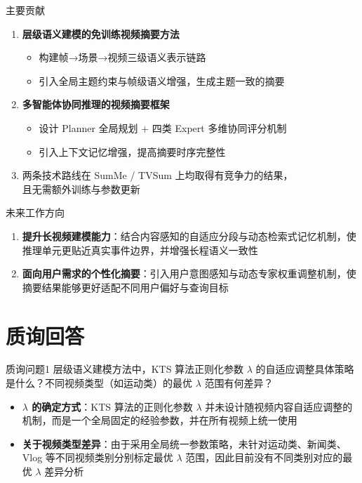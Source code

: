 \begin{frame}{主要贡献}
  \begin{enumerate}
    \item \textbf{层级语义建模的免训练视频摘要方法}
      \begin{itemize}
        \item 构建帧→场景→视频三级语义表示链路
        \item 引入全局主题约束与帧级语义增强，生成主题一致的摘要
      \end{itemize}
    \item \textbf{多智能体协同推理的视频摘要框架}
      \begin{itemize}
        \item 设计 Planner 全局规划 + 四类 Expert 多维协同评分机制
        \item 引入上下文记忆增强，提高摘要时序完整性
      \end{itemize}
    \item 两条技术路线在 SumMe / TVSum 上均取得有竞争力的结果，\\
          且无需额外训练与参数更新
  \end{enumerate}
\end{frame}

\begin{frame}{未来工作方向}
  \begin{enumerate}
    \item \textbf{提升长视频建模能力}：结合内容感知的自适应分段与动态检索式记忆机制，使推理单元更贴近真实事件边界，并增强长程语义一致性
    \item \textbf{面向用户需求的个性化摘要}：引入用户意图感知与动态专家权重调整机制，使摘要结果能够更好适配不同用户偏好与查询目标
  \end{enumerate}
\end{frame}


\section{质询回答}

\begin{frame}
  \begin{block}{质询问题1}
    层级语义建模方法中，KTS 算法正则化参数 $\lambda$ 的自适应调整具体策略是什么？不同视频类型（如运动类）的最优 $\lambda$ 范围有何差异？
  \end{block}
  \vfill
  \begin{itemize}
    \item \textbf{$\lambda$ 的确定方式}：KTS 算法的正则化参数 $\lambda$ 并未设计随视频内容自适应调整的机制，而是一个全局固定的经验参数，并在所有视频上统一使用
    \item \textbf{关于视频类型差异}：由于采用全局统一参数策略，未针对运动类、新闻类、Vlog 等不同视频类别分别标定最优 $\lambda$ 范围，因此目前没有不同类别对应的最优 $\lambda$ 差异分析
  \end{itemize}
  \vfill
\end{frame}

